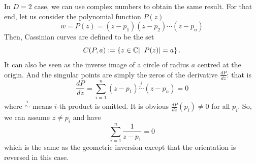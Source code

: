 \documentclass{article}
\begin{document}
In $D=2$ case, we can use complex numbers to obtain the same result. For that end, let us consider the polynomial function $P(z)$
\begin{equation}
\label{}
w = P(z) = (z-p_1)(z-p_2)\cdots(z-p_n)
\end{equation}
Then, Cassinian curves are defined to be the set
\begin{equation}
\label{ }
C(P,a) := \left\{ z \in \mathbb C | \;|P(z)| = a \right\}.
\end{equation}
It can also be seen as the inverse image of a circle of radius $a$ centred at the origin. And the singular points are simply the zeros of the derivative $\frac{dP}{dz}$: that is
\begin{equation}
\label{ }
\frac{dP}{dz} = \sum_{i=1}^{n} (z-p_1)\overset{i}{\breve{\cdots} }(z-p_n) = 0
\end{equation}
where $\overset{i}{\breve{\cdots} }$ means $i$-th product is omitted. It is obvious $\frac{dP}{dz}(p_i) \ne 0$ for all $p_i$. So, we can assume $z \ne p_i$ and have
\begin{equation}
\label{ }
\sum_{i=1}^{n} \frac{1}{z-p_1} = 0
\end{equation}
which is the same as the geometric inversion except that the orientation is reversed in this case.
\end{document}
